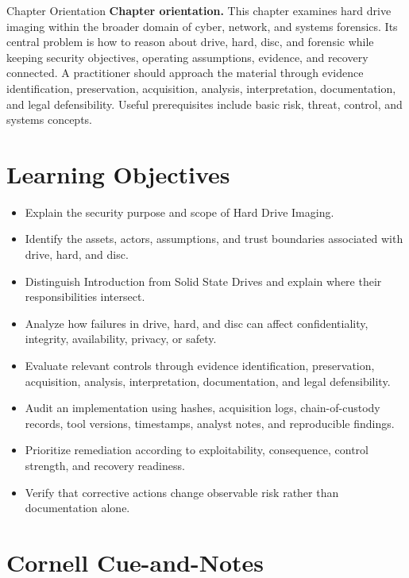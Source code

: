 \documentclass[11pt,letterpaper]{article}
\title{\CornellDocumentTitle}
\author{}
\date{}
\begin{document}
\maketitle
\begin{CornellOverviewBox}{Chapter Orientation}
\textbf{Chapter orientation.} This chapter examines hard drive imaging within the broader domain of cyber, network, and systems forensics. Its central problem is how to reason about drive, hard, disc, and forensic while keeping security objectives, operating assumptions, evidence, and recovery connected. A practitioner should approach the material through evidence identification, preservation, acquisition, analysis, interpretation, documentation, and legal defensibility. Useful prerequisites include basic risk, threat, control, and systems concepts.
\end{CornellOverviewBox}
\section*{Learning Objectives}
\begin{itemize}
\item Explain the security purpose and scope of Hard Drive Imaging.
\item Identify the assets, actors, assumptions, and trust boundaries associated with drive, hard, and disc.
\item Distinguish Introduction from Solid State Drives and explain where their responsibilities intersect.
\item Analyze how failures in drive, hard, and disc can affect confidentiality, integrity, availability, privacy, or safety.
\item Evaluate relevant controls through evidence identification, preservation, acquisition, analysis, interpretation, documentation, and legal defensibility.
\item Audit an implementation using hashes, acquisition logs, chain-of-custody records, tool versions, timestamps, analyst notes, and reproducible findings.
\item Prioritize remediation according to exploitability, consequence, control strength, and recovery readiness.
\item Verify that corrective actions change observable risk rather than documentation alone.
\end{itemize}
\section*{Cornell Cue-and-Notes}
\end{document}
